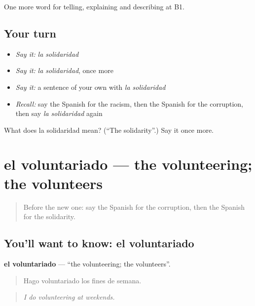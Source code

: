 \begin{grammarlens}[title={What you've built}]
One more word for telling, explaining and describing at B1.
\end{grammarlens}

\subsection*{Your turn}
\begin{itemize}
\raggedright
  \item \emph{Say it:} \emph{la solidaridad}
  \item \emph{Say it:} \emph{la solidaridad}, once more
  \item \emph{Say it:} a sentence of your own with \emph{la solidaridad}
  \item \emph{Recall:} say the Spanish for the racism, then the Spanish for the corruption, then say \emph{la solidaridad} again
\end{itemize}

\begin{tcolorbox}[breakable,colback=teal!4,colframe=teal!35!black,title={Before you move on}]
What does la solidaridad mean? (\textquotedblleft{}The solidarity\textquotedblright{}.) Say it once more.
\end{tcolorbox}
\section[el voluntariado]{el voluntariado — the volunteering; the volunteers}

\label{lesson:ES-C606-voluntariado}



\begin{quote}
Before the new one: say the Spanish for the corruption, then the Spanish for the solidarity.
\end{quote}

\subsection*{You'll want to know: el voluntariado}
\textbf{el voluntariado} — \textquotedblleft{}the volunteering; the volunteers\textquotedblright{}.

\begin{quote}
Hago voluntariado los fines de semana.
\end{quote}

\begin{quote}
\emph{I do volunteering at weekends.}
\end{quote}

